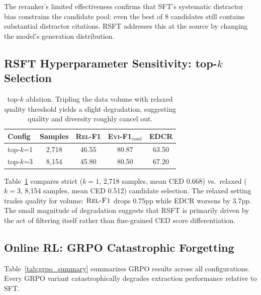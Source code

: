 \documentclass[11pt,a4paper]{article}
\newcommand{\evi}{\textsc{Evi-F1}}
\newcommand{\edcr}{\textsc{EDCR}}
\newcommand{\relf}{\textsc{Rel-F1}}
\begin{document}
The reranker's limited effectiveness confirms that SFT's systematic distractor bias constrains the candidate pool: even the best of 8 candidates still contains substantial distractor citations. RSFT addresses this at the source by changing the model's generation distribution.

\subsection{RSFT Hyperparameter Sensitivity: top-$k$ Selection}
\label{sec:topk}

\begin{table}[t]
\centering
\small
\begin{tabular}{lcccc}
\toprule
\textbf{Config} & \textbf{Samples} & \textbf{\relf{}} & \textbf{\evi{}$_\text{cond}$} & \textbf{\edcr{}} \\
\midrule
top-$k$=1 & 2,718 & 46.55 & 80.87 & 63.50 \\
top-$k$=3 & 8,154 & 45.80 & 80.50 & 67.20 \\
\bottomrule
\end{tabular}
\caption{top-$k$ ablation. Tripling the data volume with relaxed quality threshold yields a slight degradation, suggesting quality and diversity roughly cancel out.}
\label{tab:topk}
\end{table}

Table~\ref{tab:topk} compares strict ($k{=}1$, 2,718 samples, mean CED 0.668) vs.\ relaxed ($k{=}3$, 8,154 samples, mean CED 0.512) candidate selection. The relaxed setting trades quality for volume: $\relf{}$ drops 0.75pp while \edcr{} worsens by 3.7pp. The small magnitude of degradation suggests that RSFT is primarily driven by the act of filtering itself rather than fine-grained CED score differentiation.

\subsection{Online RL: GRPO Catastrophic Forgetting}
\label{sec:grpo}

Table~\ref{tab:grpo_summary} summarizes GRPO results across all configurations. Every GRPO variant catastrophically degrades extraction performance relative to SFT.
\end{document}
